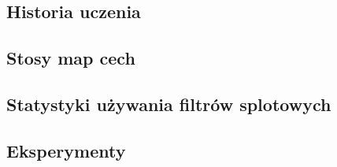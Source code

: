 \documentclass{article}
\begin{document}
\subsection{Historia uczenia}

\subsection{Stosy map cech}

\subsection{Statystyki używania filtrów splotowych}

\subsection{Eksperymenty}




	
\end{document}
